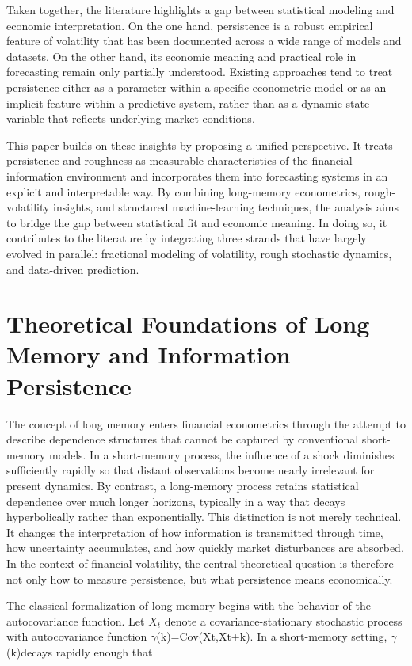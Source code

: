 \documentclass[12pt]{article}
\begin{document}
Taken together, the literature highlights a gap between statistical modeling and economic interpretation. On the one hand, persistence is a robust empirical feature of volatility that has been documented across a wide range of models and datasets. On the other hand, its economic meaning and practical role in forecasting remain only partially understood. Existing approaches tend to treat persistence either as a parameter within a specific econometric model or as an implicit feature within a predictive system, rather than as a dynamic state variable that reflects underlying market conditions.

This paper builds on these insights by proposing a unified perspective. It treats persistence and roughness as measurable characteristics of the financial information environment and incorporates them into forecasting systems in an explicit and interpretable way. By combining long-memory econometrics, rough-volatility insights, and structured machine-learning techniques, the analysis aims to bridge the gap between statistical fit and economic meaning. In doing so, it contributes to the literature by integrating three strands that have largely evolved in parallel: fractional modeling of volatility, rough stochastic dynamics, and data-driven prediction.



\section{Theoretical Foundations of Long Memory and Information Persistence}
\label{sec:theory}

The concept of long memory enters financial econometrics through the attempt to describe dependence structures that cannot be captured by conventional short-memory models. In a short-memory process, the influence of a shock diminishes sufficiently rapidly so that distant observations become nearly irrelevant for present dynamics. By contrast, a long-memory process retains statistical dependence over much longer horizons, typically in a way that decays hyperbolically rather than exponentially. This distinction is not merely technical. It changes the interpretation of how information is transmitted through time, how uncertainty accumulates, and how quickly market disturbances are absorbed. In the context of financial volatility, the central theoretical question is therefore not only how to measure persistence, but what persistence means economically.

The classical formalization of long memory begins with the behavior of the autocovariance function. Let $X_t$ denote a covariance-stationary stochastic process with autocovariance function $\gamma$(k)=Cov(Xt,Xt+k). In a short-memory setting, $\gamma$(k)decays rapidly enough that
\end{document}
